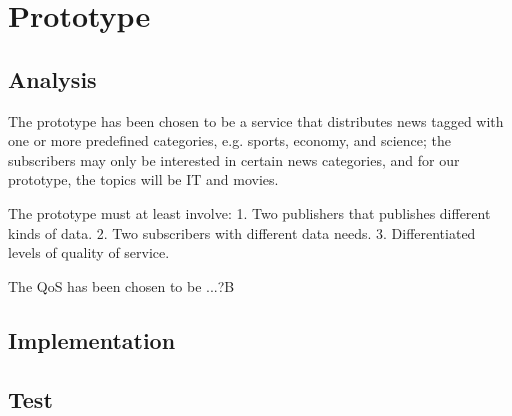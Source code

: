 \chapter{Prototype}
\section{Analysis}
The prototype has been chosen to be a service that distributes news tagged with one or more predefined categories,
e.g. sports, economy, and science; the subscribers may only be interested in certain news
categories, and for our prototype, the topics will be IT and movies.

The prototype must at least involve:
1. Two publishers that publishes different kinds of data.
2. Two subscribers with different data needs.
3. Differentiated levels of quality of service.

The QoS has been chosen to be ...?B

\section{Implementation}

\section{Test}
